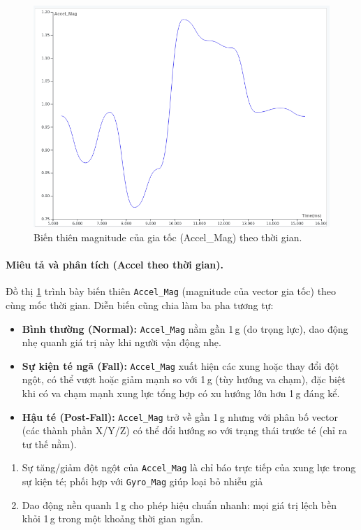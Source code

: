 \vspace{6pt}

\begin{figure}[H]
    \centering
    \includegraphics[width=0.95\linewidth]{figures/accel_time.png}
    \caption{Biến thiên magnitude của gia tốc (Accel\_Mag) theo thời gian.}
    \label{fig:accel_time}
\end{figure}

\paragraph{Miêu tả và phân tích (Accel theo thời gian).}
Đồ thị \ref{fig:accel_time} trình bày biến thiên \texttt{Accel\_Mag} (magnitude của vector gia tốc) theo cùng mốc thời gian. Diễn biến cũng chia làm ba pha tương tự:
\begin{itemize}
  \item \textbf{Bình thường (Normal):} \texttt{Accel\_Mag} nằm gần 1\,g (do trọng lực), dao động nhẹ quanh giá trị này khi người vận động nhẹ.
  \item \textbf{Sự kiện té ngã (Fall):} \texttt{Accel\_Mag} xuất hiện các xung hoặc thay đổi đột ngột, có thể vượt hoặc giảm mạnh so với 1\,g (tùy hướng va chạm), đặc biệt khi có va chạm mạnh xung lực tổng hợp có xu hướng lớn hơn 1\,g đáng kể.
  \item \textbf{Hậu té (Post-Fall):} \texttt{Accel\_Mag} trở về gần 1\,g nhưng với phân bố vector (các thành phần X/Y/Z) có thể đổi hướng so với trạng thái trước té (chỉ ra tư thế nằm).
\end{itemize}

\begin{enumerate}
  \item Sự tăng/giảm đột ngột của \texttt{Accel\_Mag} là chỉ báo trực tiếp của xung lực trong sự kiện té; phối hợp với \texttt{Gyro\_Mag} giúp loại bỏ nhiễu giả   \item Dao động nền quanh 1\,g cho phép hiệu chuẩn nhanh: mọi giá trị lệch bền khỏi 1\,g trong một khoảng thời gian ngắn.
\end{enumerate}

